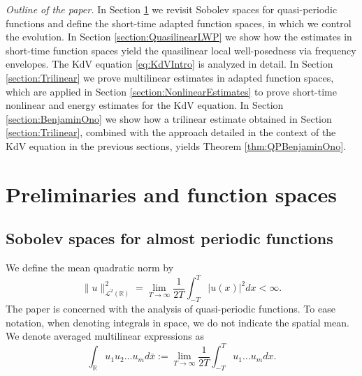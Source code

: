 \documentclass{amsart}
\theoremstyle{definition}
\newcommand{\R}{\mathbb{R}}
\begin{document}
\smallskip

\emph{Outline of the paper.} In Section \ref{section:Prelim} we revisit Sobolev spaces for quasi-periodic functions and define the short-time adapted function spaces, in which we control the evolution. In Section \ref{section:QuasilinearLWP} we show how the estimates in short-time function spaces yield the quasilinear local well-posedness via frequency envelopes. The KdV equation \eqref{eq:KdVIntro} is analyzed in detail. In Section \ref{section:Trilinear} we prove multilinear estimates in adapted function spaces, which are applied in Section \ref{section:NonlinearEstimates} to prove short-time nonlinear and energy estimates for the KdV equation. In Section \ref{section:BenjaminOno} we show how a trilinear estimate obtained in Section \ref{section:Trilinear}, combined with the approach detailed in the context of the KdV equation in the previous sections, yields Theorem \ref{thm:QPBenjaminOno}.

\section{Preliminaries and function spaces}
\label{section:Prelim}

\subsection{Sobolev spaces for almost periodic functions}
We define the mean quadratic norm by
\begin{equation*}
\| u \|_{\mathcal{L}^2(\R)}^2 = \lim_{T \to \infty} \frac{1}{2T} \int_{-T}^T |u(x)|^2 dx < \infty.
\end{equation*}
The paper is concerned with the analysis of quasi-periodic functions. To ease notation, when denoting integrals in space, we do not indicate the spatial mean. We denote averaged multilinear expressions as
\begin{equation*}
\int_{\R} u_1 u_2 \ldots u_m d\bar{x} := \lim_{T \to \infty} \frac{1}{2T} \int_{-T}^T u_1 \ldots u_m dx.
\end{equation*}
\end{document}

